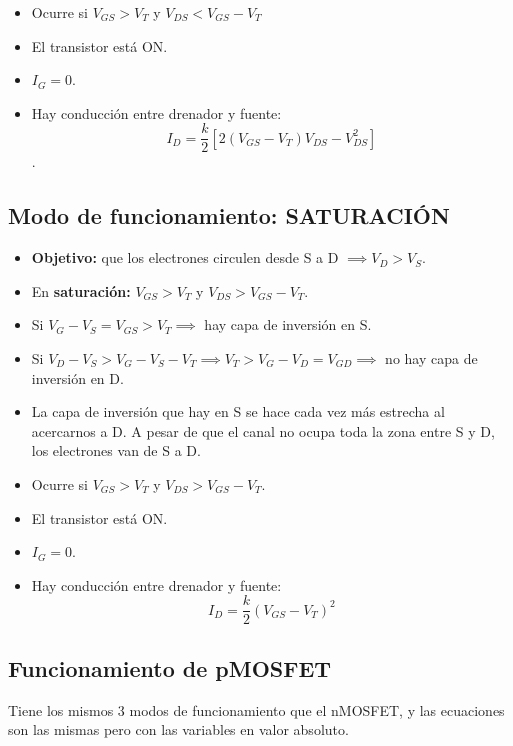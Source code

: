 \documentclass[10pt,a4paper]{article}
\begin{document}
	\vspace*{1cm}
	
	\begin{itemize}
		\item Ocurre si $V_{GS} > V_T$ y $V_{DS} < V_{GS} - V_T$
		\item El transistor está ON.
		\item $I_G = 0$.
		\item Hay conducción entre drenador y fuente: $$I_D = \dfrac{k}{2}[2(V_{GS} - V_T)V_{DS} - V_{DS}^2]$$.
	\end{itemize}

	\subsection{Modo de funcionamiento: SATURACIÓN}
	
	
	\begin{itemize}
		\item \textbf{Objetivo: }que los electrones circulen desde S a D $\implies V_D > V_S$.
		\item En \textbf{saturación: }$V_{GS} > V_T$ y $V_{DS} > V_{GS} - V_T$.
		\item Si $V_G - V_S = V_{GS} > V_T \implies$ hay capa de inversión en S.
		\item Si $V_D - V_S > V_G - V_S - V_T \implies V_T > V_G - V_D = V_{GD} \implies$ no hay capa de inversión en D.
		\item La capa de inversión que hay en S se hace cada vez más estrecha al acercarnos a D. A pesar de que el canal no ocupa toda la zona entre S y D, los electrones van de S a D.
	\end{itemize}
	\vspace*{0pt}
	\begin{itemize}
		\item Ocurre si $V_{GS} > V_T$ y $V_{DS} > V_{GS} - V_T$.
		\item El transistor está ON.
		\item $I_G = 0$.
		\item Hay conducción entre drenador y fuente: $$I_D = \dfrac{k}{2}(V_{GS} - V_T)^2$$
	\end{itemize}

	\subsection{Funcionamiento de pMOSFET}
	
	Tiene los mismos 3 modos de funcionamiento que el nMOSFET, y las ecuaciones son las mismas pero con las variables en valor absoluto.
\end{document}
